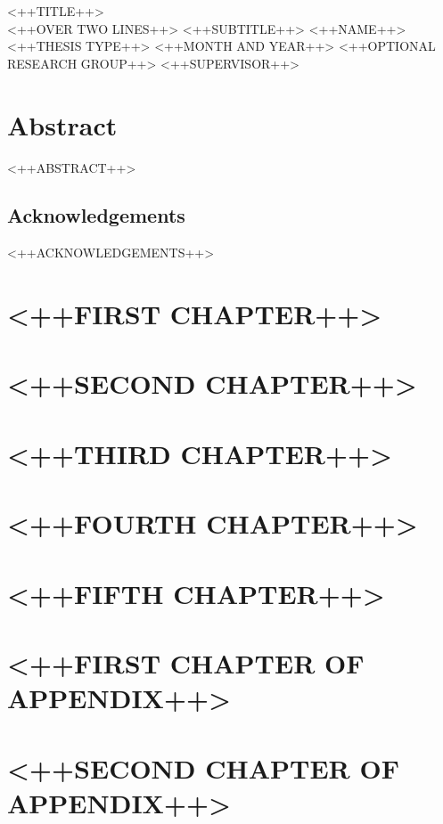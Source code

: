 \documentclass[11pt]{book}
\begin{document}
\frontmatter

\studtitlepage%
{<++TITLE++> \\[.1em]
<++OVER TWO LINES++>}%
{<++SUBTITLE++>}%
{<++NAME++>}%
{<++THESIS TYPE++>}%
{<++MONTH AND YEAR++>}%
{<++OPTIONAL RESEARCH GROUP++>}%
{<++SUPERVISOR++>}
\cleardoublepage
\studeidesstatt

\chapter*{Abstract}
<++ABSTRACT++>

\section*{Acknowledgements}
<++ACKNOWLEDGEMENTS++>

\tableofcontents
\listoffigures
\listoftables
\mainmatter

\chapter{<++FIRST CHAPTER++>}
\cite{Test}
\chapter{<++SECOND CHAPTER++>}
\chapter{<++THIRD CHAPTER++>}
\chapter{<++FOURTH CHAPTER++>}
\chapter{<++FIFTH CHAPTER++>}

\appendix
\chapter{<++FIRST CHAPTER OF APPENDIX++>}
\chapter{<++SECOND CHAPTER OF APPENDIX++>}

\backmatter
\tocbibliography
\end{document}
